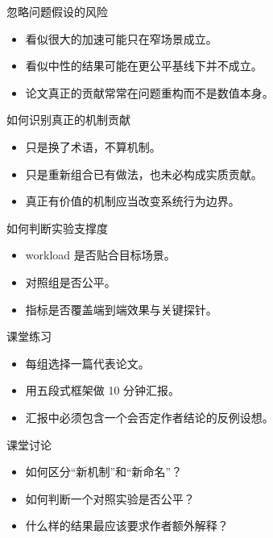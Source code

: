 \begin{frame}{忽略问题假设的风险}
  \begin{itemize}
    \item 看似很大的加速可能只在窄场景成立。
    \item 看似中性的结果可能在更公平基线下并不成立。
    \item 论文真正的贡献常常在问题重构而不是数值本身。
  \end{itemize}
\end{frame}

\begin{frame}{如何识别真正的机制贡献}
  \begin{itemize}
    \item 只是换了术语，不算机制。
    \item 只是重新组合已有做法，也未必构成实质贡献。
    \item 真正有价值的机制应当改变系统行为边界。
  \end{itemize}
\end{frame}

\begin{frame}{如何判断实验支撑度}
  \begin{itemize}
    \item workload 是否贴合目标场景。
    \item 对照组是否公平。
    \item 指标是否覆盖端到端效果与关键探针。
  \end{itemize}
\end{frame}



\begin{frame}{课堂练习}
  \begin{itemize}
    \item 每组选择一篇代表论文。
    \item 用五段式框架做 10 分钟汇报。
    \item 汇报中必须包含一个会否定作者结论的反例设想。
  \end{itemize}
\end{frame}

\begin{frame}{课堂讨论}
  \begin{itemize}
    \item 如何区分“新机制”和“新命名”？
    \item 如何判断一个对照实验是否公平？
    \item 什么样的结果最应该要求作者额外解释？
  \end{itemize}
\end{frame}

